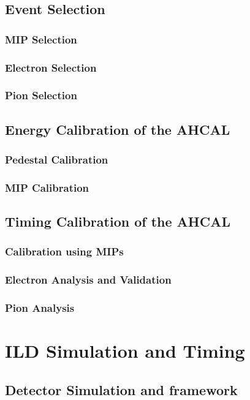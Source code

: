 \documentclass[a4paper,12pt]{report}
\begin{document}
\section{Event Selection}
\subsection{MIP Selection}
\subsection{Electron Selection}
\subsection{Pion Selection}
\section{Energy Calibration of the AHCAL}
\subsection{Pedestal Calibration}
\subsection{MIP Calibration}
\section{Timing Calibration of the AHCAL}
\subsection{Calibration using MIPs}
\subsection{Electron Analysis and Validation}
\subsection{Pion Analysis}

\newpage

\chapter{ILD Simulation and Timing}
\section{Detector Simulation and framework}
\end{document}
